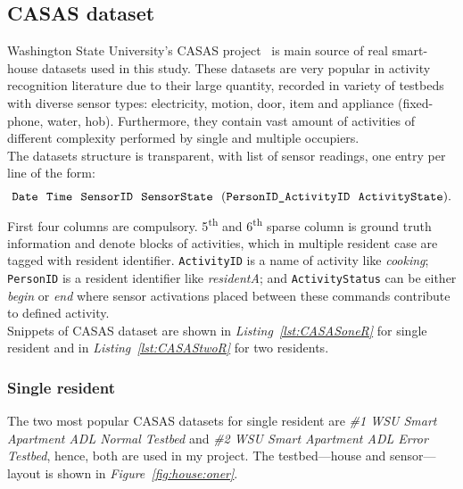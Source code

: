 \documentclass[12pt, a4paper, pdflatex, leqno, twoside, openright]{report}
\newcommand{\ts}{\textsuperscript}
\begin{document}
    \subsection{CASAS dataset}
Washington State University's CASAS project~\citep{cook2009assessing} is main source of real smart-house datasets used in this study. These datasets are very popular in activity recognition literature due to their large quantity, recorded in variety of testbeds with diverse sensor types: electricity, motion, door, item and appliance (fixed-phone, water, hob). Furthermore, they contain vast amount of activities of different complexity performed by single and multiple occupiers.\\
The datasets structure is transparent, with list of sensor readings, one entry per line of the form:
$$
\text{\texttt{Date}~~\texttt{Time}~~\texttt{SensorID}~~\texttt{SensorState}~~(\texttt{PersonID\_ActivityID}~~\texttt{ActivityState}).}
$$
First four columns are compulsory. 5\ts{th} and 6\ts{th} sparse column is ground truth information and denote blocks of activities, which in multiple resident case are tagged with resident identifier. \texttt{ActivityID} is a name of activity like \emph{cooking}; \texttt{PersonID} is a resident identifier like \emph{residentA}; and \texttt{ActivityStatus} can be either \emph{begin} or \emph{end} where sensor activations placed between these commands contribute to defined activity.\\
Snippets of CASAS dataset are shown in \emph{Listing~\ref{lst:CASASoneR}} for single resident and in \emph{Listing~\ref{lst:CASAStwoR}} for two residents.

      \subsubsection{Single resident}
The two most popular CASAS datasets for single resident are \emph{\#1 WSU Smart Apartment ADL Normal Testbed} and \emph{\#2 WSU Smart Apartment ADL Error Testbed}, hence, both are used in my project. The testbed---house and sensor---layout is shown in \emph{Figure~\ref{fig:house:oner}}.
\end{document}

